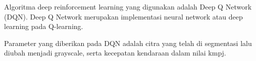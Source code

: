 Algoritma deep reinforcement learning yang digunakan adalah Deep Q Network (DQN). Deep Q Network merupakan implementasi neural network atau deep learning pada Q-learning.

Parameter yang diberikan pada DQN adalah citra yang telah di segmentasi lalu diubah menjadi grayscale, serta kecepatan kendaraan dalam nilai kmpj.
\fi

